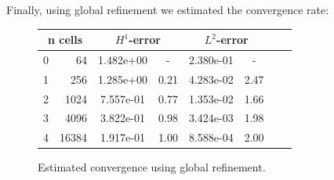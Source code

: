 \documentclass[9pt]{beamer}
\begin{document}
\begin{frame}
	Finally, using global refinement we estimated the convergence rate:
	\begin{figure}
		\begin{table}[H]
			\begin{center}
				\begin{tabular}{|c|r|c|c|c|c|c|c|} \hline
					
					\multicolumn{2}{|c|}{n cells} & 
					\multicolumn{2}{|c|}{$H^1$-error} & 
					\multicolumn{2}{|c|}{$L^2$-error}\\ \hline
					0 & 64 & 1.482e+00  & - & 2.380e-01  & -\\ \hline
					1 & 256 & 1.285e+00  & 0.21 & 4.283e-02 &  2.47\\ \hline
					2 & 1024 & 7.557e-01  & 0.77 & 1.353e-02 &  1.66\\ \hline
					3 & 4096 & 3.822e-01  & 0.98 & 3.424e-03 &  1.98\\ \hline
					4 & 16384 & 1.917e-01  & 1.00 & 8.588e-04 &  2.00\\ \hline
				\end{tabular}
			\end{center}
		\end{table}
		\caption{Estimated convergence using global refinement.}
	\end{figure}
\end{frame}
\end{document}
